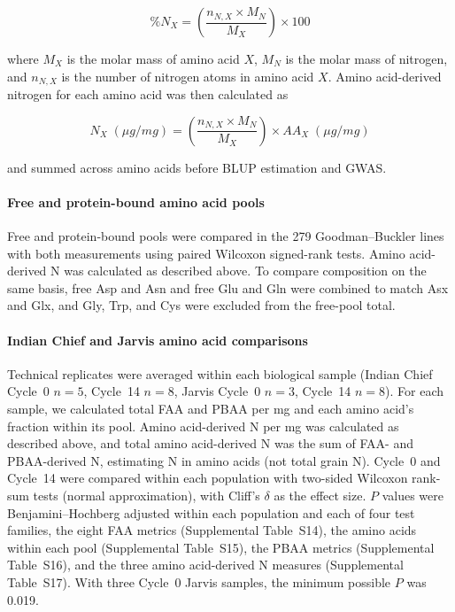 \documentclass[11pt]{article}
\begin{document}
\[
\%N_X =
\left(
\frac{n_{N,X}\times M_N}{M_X}
\right)\times 100
\]

where $M_X$ is the molar mass of amino acid $X$, $M_N$ is the molar mass of nitrogen, and $n_{N,X}$ is the number of nitrogen atoms in amino acid $X$. Amino acid-derived nitrogen for each amino acid was then calculated as

\[
N_X\;(\mu g/mg) =
\left(
\frac{n_{N,X}\times M_N}{M_X}
\right)
\times AA_X\;(\mu g/mg)
\]

and summed across amino acids before BLUP estimation and GWAS.

\paragraph*{Free and protein-bound amino acid pools}
Free and protein-bound pools were compared in the 279 Goodman--Buckler lines with both measurements \citep{Shrestha2022} using paired Wilcoxon signed-rank tests. Amino acid-derived N was calculated as described above. To compare composition on the same basis, free Asp and Asn and free Glu and Gln were combined to match Asx and Glx, and Gly, Trp, and Cys were excluded from the free-pool total.

\paragraph*{Indian Chief and Jarvis amino acid comparisons}
Technical replicates were averaged within each biological sample (Indian Chief Cycle~0 $n = 5$, Cycle~14 $n = 8$, Jarvis Cycle~0 $n = 3$, Cycle~14 $n = 8$). For each sample, we calculated total FAA and PBAA per mg and each amino acid’s fraction within its pool. Amino acid-derived N per mg was calculated as described above, and total amino acid-derived N was the sum of FAA- and PBAA-derived N, estimating N in amino acids (not total grain N). Cycle~0 and Cycle~14 were compared within each population with two-sided Wilcoxon rank-sum tests (normal approximation), with Cliff’s $\delta$ as the effect size. $P$ values were Benjamini--Hochberg adjusted within each population and each of four test families, the eight FAA metrics (Supplemental Table~S14), the amino acids within each pool (Supplemental Table~S15), the PBAA metrics (Supplemental Table~S16), and the three amino acid-derived N measures (Supplemental Table~S17). With three Cycle~0 Jarvis samples, the minimum possible $P$ was 0.019.
\end{document}
